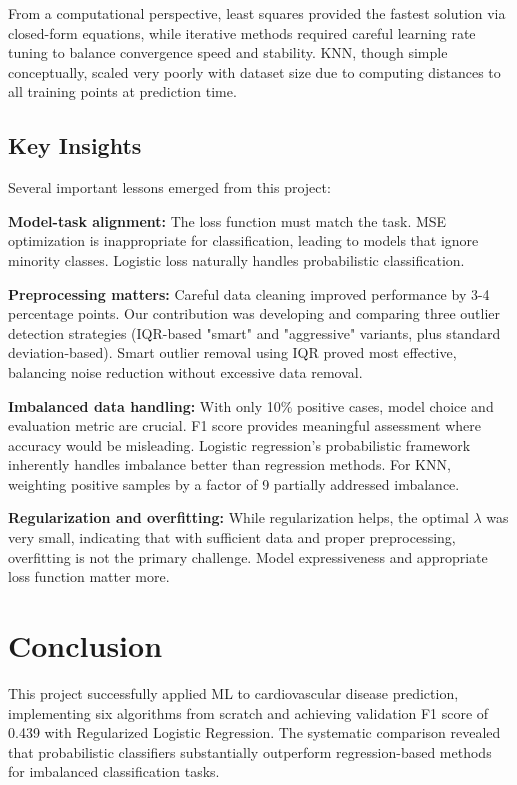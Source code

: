 \documentclass[10pt,conference,compsocconf]{IEEEtran}
\begin{document}
From a computational perspective, least squares provided the fastest solution via closed-form equations, while iterative methods required careful learning rate tuning to balance convergence speed and stability. KNN, though simple conceptually, scaled very poorly with dataset size due to computing distances to all training points at prediction time.

\subsection{Key Insights}

Several important lessons emerged from this project:

\textbf{Model-task alignment:} The loss function must match the task. MSE optimization is inappropriate for classification, leading to models that ignore minority classes. Logistic loss naturally handles probabilistic classification.

\textbf{Preprocessing matters:} Careful data cleaning improved performance by 3-4 percentage points. Our contribution was developing and comparing three outlier detection strategies (IQR-based "smart" and "aggressive" variants, plus standard deviation-based). Smart outlier removal using IQR proved most effective, balancing noise reduction without excessive data removal.

\textbf{Imbalanced data handling:} With only 10\% positive cases, model choice and evaluation metric are crucial. F1 score provides meaningful assessment where accuracy would be misleading. Logistic regression's probabilistic framework inherently handles imbalance better than regression methods. For KNN, weighting positive samples by a factor of 9 partially addressed imbalance.

\textbf{Regularization and overfitting:} While regularization helps, the optimal $\lambda$ was very small, indicating that with sufficient data and proper preprocessing, overfitting is not the primary challenge. Model expressiveness and appropriate loss function matter more.

\section{Conclusion}

This project successfully applied ML to cardiovascular disease prediction, implementing six algorithms from scratch and achieving validation F1 score of 0.439 with Regularized Logistic Regression. The systematic comparison revealed that probabilistic classifiers substantially outperform regression-based methods for imbalanced classification tasks.
\end{document}
